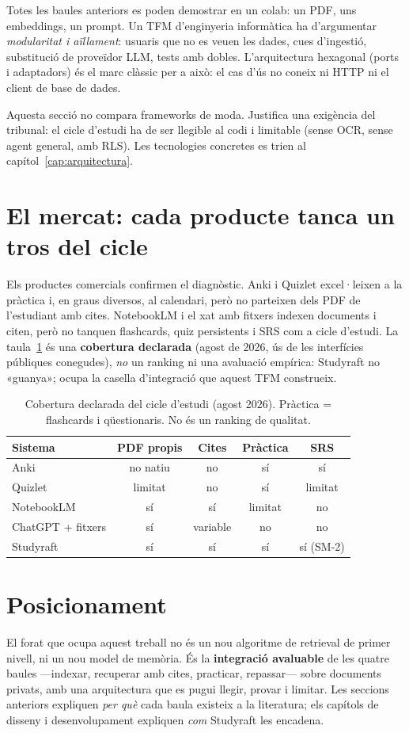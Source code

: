 Totes les baules anteriors es poden demostrar en un colab: un PDF, uns embeddings, un prompt. Un TFM d'enginyeria informàtica ha d'argumentar \emph{modularitat i aïllament}: usuaris que no es veuen les dades, cues d'ingestió, substitució de proveïdor LLM, tests amb dobles. L'arquitectura hexagonal (ports i adaptadors) \parencite{cockburn2005hexagonal} és el marc clàssic per a això: el cas d'ús no coneix ni HTTP ni el client de base de dades.

Aquesta secció no compara frameworks de moda. Justifica una exigència del tribunal: el cicle d'estudi ha de ser llegible al codi i limitable (sense OCR, sense agent general, amb RLS). Les tecnologies concretes es trien al capítol~\ref{cap:arquitectura}.

\section{El mercat: cada producte tanca un tros del cicle}

Els productes comercials confirmen el diagnòstic. Anki i Quizlet excel·leixen a la pràctica i, en graus diversos, al calendari, però no parteixen dels PDF de l'estudiant amb cites. NotebookLM i el xat amb fitxers indexen documents i citen, però no tanquen flashcards, quiz persistents i SRS com a cicle d'estudi. La taula~\ref{tab:relacionados} és una \textbf{cobertura declarada} (agost de 2026, ús de les interfícies públiques conegudes), \emph{no} un ranking ni una avaluació empírica: Studyraft no «guanya»; ocupa la casella d'integració que aquest TFM construeix.

\begin{table}[htbp]
\centering
\caption{Cobertura declarada del cicle d'estudi (agost 2026). Pràctica = flashcards i qüestionaris. No és un ranking de qualitat.}
\label{tab:relacionados}
\small
\begin{tabular}{lcccc}
\toprule
Sistema & PDF propis & Cites & Pràctica & SRS \\
\midrule
Anki & no natiu & no & sí & sí \\
Quizlet & limitat & no & sí & limitat \\
NotebookLM & sí & sí & limitat & no \\
ChatGPT + fitxers & sí & variable & no & no \\
Studyraft & sí & sí & sí & sí (SM-2) \\
\bottomrule
\end{tabular}
\end{table}

\section{Posicionament}

El forat que ocupa aquest treball no és un nou algoritme de retrieval de primer nivell, ni un nou model de memòria. És la \textbf{integració avaluable} de les quatre baules ---indexar, recuperar amb cites, practicar, repassar--- sobre documents privats, amb una arquitectura que es pugui llegir, provar i limitar. Les seccions anteriors expliquen \emph{per què} cada baula existeix a la literatura; els capítols de disseny i desenvolupament expliquen \emph{com} Studyraft les encadena.
